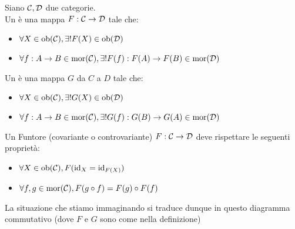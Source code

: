 \documentclass{article}
\begin{document}
\begin{definition}
    Siano $\mathcal{C}, \mathcal{D}$ due categorie.\\
    Un  è una mappa $F: \mathcal{C}\to\mathcal{D}$ tale che:\begin{itemize}
        \item $\forall X \in \operatorname{ob}(\mathcal{C}), \exists! F(X)\in \operatorname{ob}(\mathcal{D})$
        \item $\forall f:A\to B \in \operatorname{mor}(\mathcal{C}), \exists! F(f):F(A)\to F(B) \in \operatorname{mor}(\mathcal{D})$
    \end{itemize}
    Un  è una mappa $G$ da $C$ a $D$ tale che:\begin{itemize}
        \item $\forall X \in \operatorname{ob}(\mathcal{C}), \exists! G(X)\in \operatorname{ob}(\mathcal{D})$
        \item $\forall f:A\to B \in \operatorname{mor}(\mathcal{C}), \exists! G(f):G(B)\to G(A) \in \operatorname{mor}(\mathcal{D})$
    \end{itemize}
    Un Funtore (covariante o controvariante) $F:\mathcal{C}\to \mathcal{D}$ deve rispettare le seguenti proprietà:\begin{itemize}
        \item $\forall X \in \operatorname{ob}(\mathcal{C}), F(\operatorname{id}_{X} = \operatorname{id}_{F(X)})$
        \item $\forall f,g \in \operatorname{mor}(\mathcal{C}),F(g\circ f) = F(g) \circ F(f)$
    \end{itemize}
\end{definition}

La situazione che stiamo immaginando si traduce dunque in questo diagramma commutativo (dove $F$ e $G$ sono come nella definizione)
\end{document}
